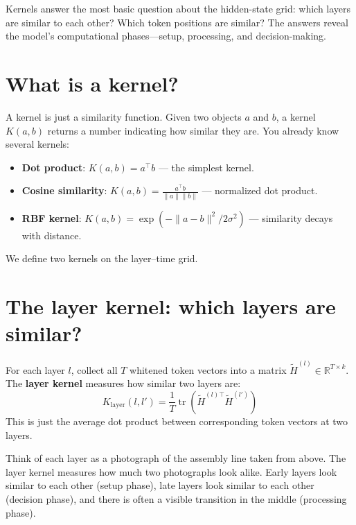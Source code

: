 \documentclass[11pt, twoside, openright]{memoir}
\begin{document}
\begin{whycare}
Kernels answer the most basic question about the hidden-state grid: which
layers are similar to each other? Which token positions are similar? The
answers reveal the model's computational phases---setup, processing,
and decision-making.
\end{whycare}

\section{What is a kernel?}

A kernel is just a similarity function. Given two objects $a$ and $b$, a
kernel $K(a, b)$ returns a number indicating how similar they are. You already
know several kernels:

\begin{itemize}[nosep]
\item \textbf{Dot product}: $K(a, b) = a^\top b$ --- the simplest kernel.
\item \textbf{Cosine similarity}: $K(a, b) = \frac{a^\top b}{\|a\|\|b\|}$
  --- normalized dot product.
\item \textbf{RBF kernel}: $K(a, b) = \exp(-\|a - b\|^2 / 2\sigma^2)$
  --- similarity decays with distance.
\end{itemize}

We define two kernels on the layer--time grid.

\section{The layer kernel: which layers are similar?}

For each layer $l$, collect all $T$ whitened token vectors into a matrix
$\widetilde{H}^{(l)} \in \mathbb{R}^{T \times k}$. The \textbf{layer kernel}
measures how similar two layers are:
\[
  K_{\text{layer}}(l, l') = \frac{1}{T}
  \operatorname{tr}\!\left(
    \widetilde{H}^{(l)\top} \widetilde{H}^{(l')}
  \right)
\]
This is just the average dot product between corresponding token vectors at
two layers.

\begin{analogy}
Think of each layer as a photograph of the assembly line taken from above.
The layer kernel measures how much two photographs look alike. Early layers
look similar to each other (setup phase), late layers look similar to each
other (decision phase), and there is often a visible transition in the
middle (processing phase).
\end{analogy}
\end{document}
